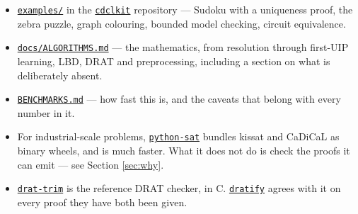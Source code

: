 \documentclass[11pt,a4paper]{article}
\newcommand{\pkg}[1]{\href{https://pypi.org/project/#1/}{\texttt{#1}}}
\newcommand{\repo}[1]{\href{https://github.com/carlok/#1}{\texttt{#1}}}
\begin{document}
\begin{itemize}[leftmargin=1.3em]
\item \href{https://github.com/carlok/cdclkit/tree/main/examples}%
      {\texttt{examples/}} in the \repo{cdclkit} repository --- Sudoku with a
      uniqueness proof, the zebra puzzle, graph colouring, bounded model
      checking, circuit equivalence.
\item \href{https://github.com/carlok/cdclkit/blob/main/docs/ALGORITHMS.md}%
      {\texttt{docs/ALGORITHMS.md}} --- the mathematics, from resolution
      through first-UIP learning, LBD, DRAT and preprocessing, including a
      section on what is deliberately absent.
\item \href{https://github.com/carlok/cdclkit/blob/main/BENCHMARKS.md}%
      {\texttt{BENCHMARKS.md}} --- how fast this is, and the caveats that
      belong with every number in it.
\item For industrial-scale problems, \pkg{python-sat} bundles kissat and
      CaDiCaL as binary wheels, and is much faster. What it does not do is
      check the proofs it can emit --- see Section \ref{sec:why}.
\item \href{https://github.com/marijnheule/drat-trim}{\texttt{drat-trim}} is
      the reference DRAT checker, in C. \pkg{dratify} agrees with it on every
      proof they have both been given.
\end{itemize}
\end{document}
